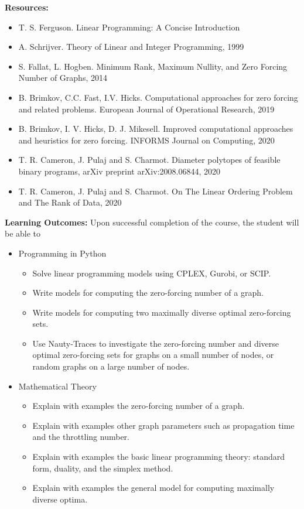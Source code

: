 \documentclass[11pt]{article}
\begin{document}
\vspace*{.10in}
\noindent\textbf{Resources:}
\begin{itemize}
\item	T. S. Ferguson. Linear Programming: A Concise Introduction
\item A. Schrijver. Theory of Linear and Integer Programming, 1999
\item S. Fallat, L. Hogben. Minimum Rank, Maximum Nullity, and Zero Forcing Number of Graphs, 2014
\item B. Brimkov, C.C. Fast, I.V. Hicks. Computational approaches for zero forcing and related problems. European Journal of Operational Research, 2019
\item	B. Brimkov, I. V. Hicks, D. J. Mikesell. Improved computational approaches and heuristics for zero forcing. INFORMS Journal on Computing, 2020
\item T. R. Cameron, J. Pulaj and S. Charmot. Diameter polytopes of feasible binary programs, arXiv preprint arXiv:2008.06844, 2020
\item T. R. Cameron, J. Pulaj and S. Charmot. On The Linear Ordering Problem and The Rank of Data, 2020
\end{itemize}

\vspace*{.10in}
\noindent\textbf{Learning Outcomes:}
Upon successful completion of the course, the student will be able to
\begin{itemize}
\item Programming in Python
\begin{itemize}
\item Solve linear programming models using CPLEX, Gurobi, or SCIP.
\item Write models for computing the zero-forcing number of a graph.
\item Write models for computing two maximally diverse optimal zero-forcing sets. 
\item	Use Nauty-Traces to investigate the zero-forcing number and diverse optimal zero-forcing sets for graphs on a small number of nodes, or random graphs on a large number of nodes.
\end{itemize}

\item Mathematical Theory
\begin{itemize}
\item Explain with examples the zero-forcing number of a graph.
\item Explain with examples other graph parameters such as propagation time and the throttling number.
\item	Explain with examples the basic linear programming theory: standard form, duality, and the simplex method. 
\item Explain with examples the general model for computing maximally diverse optima.
\end{itemize}

\end{itemize}
\end{document}
